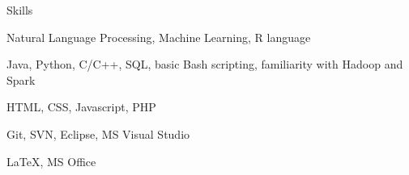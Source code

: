 \begin{rubric}{Skills}

\entry*[Research]
Natural Language Processing, Machine Learning, R language

\entry*[Programming]
Java, Python, C/C++, SQL, basic Bash scripting, familiarity with Hadoop and Spark

HTML, CSS, Javascript, PHP

Git, SVN, Eclipse, MS Visual Studio

\LaTeX, MS Office

\end{rubric}
